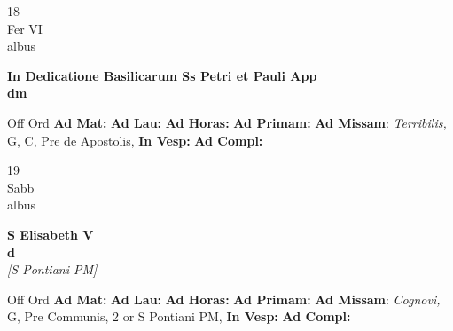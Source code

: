 \documentclass[10pt, openany]{book}
\begin{document}
        \begin{center}
            \begin{minipage}{3.5in}
                \vspace{2em}
                \begin{minipage}{0.5in}
                    {\Huge 18} \\
                    {\normalsize Fer VI} \\
                    {\normalsize albus}
                \end{minipage}
                \begin{minipage}{3.0in}
                    \textbf{ \large In Dedicatione Basilicarum Ss Petri et Pauli App \\
                    \textnormal{\normalsize dm}} \\ 
                \end{minipage}
                \begin{justify}Off Ord
                    \textbf{Ad Mat: }
                    \textbf{Ad Lau: }
                    \textbf{Ad Horas: }
                    \textbf{Ad Primam: }\textbf{Ad Missam}: \textit{Terribilis,} G, C, Pre de Apostolis,  
                    \textbf{In Vesp: }
                    \textbf{Ad Compl: }
                \end{justify}
            \end{minipage}
        \end{center}
    
        \begin{center}
            \begin{minipage}{3.5in}
                \vspace{2em}
                \begin{minipage}{0.5in}
                    {\Huge 19} \\
                    {\normalsize Sabb} \\
                    {\normalsize albus}
                \end{minipage}
                \begin{minipage}{3.0in}
                    \textbf{ \large S Elisabeth V \\
                    \textnormal{\normalsize d}} \\ \textit{[S Pontiani PM]} \\ 
                \end{minipage}
                \begin{justify}Off Ord
                    \textbf{Ad Mat: }
                    \textbf{Ad Lau: }
                    \textbf{Ad Horas: }
                    \textbf{Ad Primam: }\textbf{Ad Missam}: \textit{Cognovi,} G, Pre Communis, 2 or S Pontiani PM,  
                    \textbf{In Vesp: }
                    \textbf{Ad Compl: }
                \end{justify}
            \end{minipage}
        \end{center}
    
\end{document}
